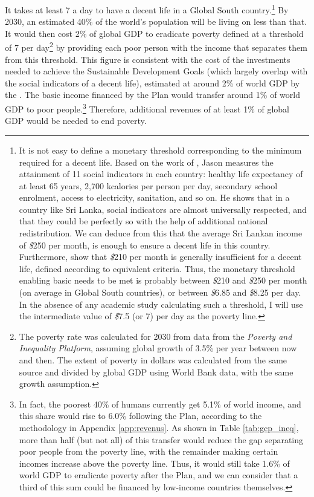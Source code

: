 \documentclass[a5paper,english,openany]{memoir}
\begin{document}
It takes at least \textit{\texteuro{}}7 a day to have a decent life in a Global South country.\footnote{It is not easy to define a monetary threshold corresponding to the minimum required for a decent life. Based on the work of \cite{oneill_good_2018}, Jason \cite{hickel_is_2019} measures the attainment of 11 social indicators in each country: healthy life expectancy of at least 65 years, 2,700 kcalories per person per day, secondary school enrolment, access to electricity, sanitation, and so on. He shows that in a country like Sri Lanka, social indicators are almost universally respected, and that they could be perfectly so with the help of additional national redistribution. We can deduce from this that the average Sri Lankan income of \textit{\$}250 
per month, %
is enough to ensure a decent life in this country. Furthermore, \cite{kikstra_decent_2021} show that \textit{\$}210 per month %
is generally insufficient for a decent life, defined according to equivalent criteria. Thus, the monetary threshold enabling basic needs to be met is probably between \textit{\$}210 and \textit{\$}250 per month (on average in Global South countries), or between \textit{\$}6.85 and \textit{\$}8.25 per day. In the absence of any academic study calculating such a threshold, I will use the intermediate value of \textit{\$}7.5 (or {\texteuro{}}7) per day as the poverty line.} 
By 2030, an estimated 40\% of the world's population will be living on less than that. %
It would then cost 2\% %
of global GDP to eradicate poverty defined at a threshold of \textit{\texteuro{}}7 per day\footnote{The poverty rate was calculated for 2030 from data from the \textit{Poverty and Inequality Platform}, assuming global growth of 3.5\% per year between now and then. The extent of poverty in dollars was calculated from the same source and divided by global GDP using World Bank data, with the same growth assumption.} 
by providing each poor person with the income that separates them from this threshold. This figure is consistent with the cost of the investments needed to achieve the Sustainable Development Goals (which largely overlap with the social indicators of a decent life), estimated at around 2\% of world GDP by the \citet{unctad_estimating_2021}. %
The basic income financed by the Plan would transfer around 1\% of world GDP to poor people.\footnote{In fact, the poorest 40\% of humans currently get 5.1\% of world income, and this share would rise to 6.0\% following the Plan, according to the methodology in Appendix \ref{app:revenus}. As shown in Table \ref{tab:gcp_ineq}, more than half (but not all) of this transfer would reduce the gap separating poor people from the poverty line, with the remainder making certain incomes increase above the poverty line. Thus, it would still take 1.6\% of world GDP to eradicate poverty after the Plan, and we can consider that a third of this sum could be financed by low-income countries themselves.} Therefore, 
additional revenues of at least 1\% of global GDP would be needed to end poverty. %
\end{document}
